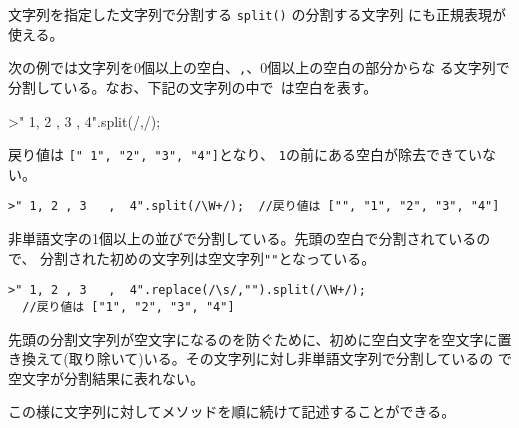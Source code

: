  \begin{Exec}\upshape
 文字列を指定した文字列で分割する \Verb+split()+ の分割する文字列
       にも正規表現が使える。

次の例では文字列を$0$個以上の空白、\Verb+,+、$0$個以上の空白の部分からな
	る文字列で分割している。なお、下記の文字列の中で\protect\verb*+ +は空白を表す。
\begin{Verbatim*}
>" 1, 2 , 3   ,  4".split(/\s*,\s*/);
\end{Verbatim*}
	戻り値は \Verb+[+\Verb*+" 1",+\Verb+ "2", "3", "4"]+となり、
	\Verb+1+の前にある空白が除去できていない。
\begin{Verbatim}
>" 1, 2 , 3   ,  4".split(/\W+/);  //戻り値は ["", "1", "2", "3", "4"]
\end{Verbatim}
非単語文字の1個以上の並びで分割している。先頭の空白で分割されているので、
 分割された初めの文字列は空文字列\Verb+""+となっている。
\begin{Verbatim}
>" 1, 2 , 3   ,  4".replace(/\s/,"").split(/\W+/);
  //戻り値は ["1", "2", "3", "4"]
\end{Verbatim}
先頭の分割文字列が空文字になるのを防ぐために、初めに空白文字を空文字に置
 き換えて(取り除いて)いる。その文字列に対し非単語文字列で分割しているの
 で空文字が分割結果に表れない。

       この様に文字列に対してメソッドを順に続けて記述することができる。
 \end{Exec}



